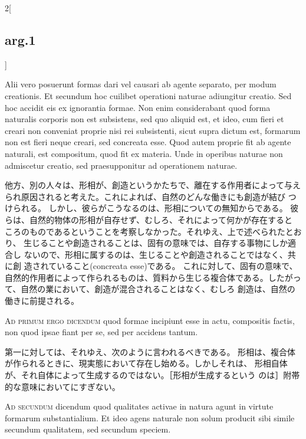 \documentclass[paper=a4paper,fontsize=10pt,jafontsize=9pt,titlepage]{jlreq}
\begin{document}
\begin{paracol}{2}[\subsection{arg.1}]
\switchcolumn*

Alii vero
posuerunt formas dari vel causari ab agente separato, per modum
creationis. Et secundum hoc cuilibet operationi naturae adiungitur
creatio. 
Sed hoc accidit eis ex ignorantia formae. Non enim
considerabant quod forma naturalis corporis non est subsistens, sed quo
aliquid est, et ideo, cum fieri et creari non conveniat proprie nisi rei
subsistenti, sicut supra dictum est, formarum non est fieri neque
creari, sed concreata esse. Quod autem proprie fit ab agente naturali,
est compositum, quod fit ex materia. Unde in operibus naturae non
admiscetur creatio, sed praesupponitur ad operationem naturae.

\switchcolumn

他方、別の人々は、形相が、創造というかたちで、離在する作用者によって与え
 られ原因されると考えた。これによれば、自然のどんな働きにも創造が結び
 つけられる。
しかし、彼らがこうなるのは、形相についての無知からである。
彼らは、自然的物体の形相が自存せず、むしろ、それによって何かが存在すると
 ころのものであるということを考察しなかった。それゆえ、上で述べられたとおり、
 生じることや創造されることは、固有の意味では、自存する事物にしか適合し
 ないので、形相に属するのは、生じることや創造されることではなく、共に創
 造されていること(concreata esse)である。
これに対して、固有の意味で、自然的作用者によって作られるものは、質料から生じる複合体である。したがって、自然の業において、創造が混合されることはなく、むしろ
 創造は、自然の働きに前提される。

\switchcolumn*[\subsection{ad.1}]

{\scshape Ad primum ergo dicendum} quod formae incipiunt
esse in actu, compositis factis, non quod ipsae fiant per se, sed per
accidens tantum.

\switchcolumn

第一に対しては、それゆえ、次のように言われるべきである。
形相は、複合体が作られるときに、現実態において存在し始める。しかしそれは、
 形相自体が、それ自体によって生成するのではない。［形相が生成するという
 のは］附帯的な意味においてにすぎない。

\switchcolumn*[\subsection{ad.2}]

{\scshape Ad secundum} dicendum quod qualitates activae
in natura agunt in virtute formarum substantialium. Et ideo agens
naturale non solum producit sibi simile secundum qualitatem, sed
secundum speciem.


\end{paracol}
\end{document}
